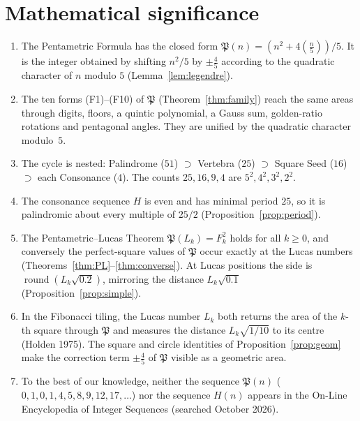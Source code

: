 \documentclass[11pt,a4paper]{article}
\newcommand{\Pent}{\mathfrak{P}}                      %
\newcommand{\leg}[1]{\left(\tfrac{#1}{5}\right)}      %
\theoremstyle{plain}
\theoremstyle{definition}
\theoremstyle{remark}
\begin{document}
\section{Mathematical significance}\label{sec:math}

\begin{enumerate}[itemsep=2pt]
  \item The Pentametric Formula has the closed form $\Pent(n)=(n^{2}+4\leg{n})/5$. It is the integer obtained by shifting $n^{2}/5$ by $\pm\tfrac45$ according to the quadratic character of $n$ modulo $5$ (Lemma~\ref{lem:legendre}).
  \item The ten forms (F1)–(F10) of $\Pent$ (Theorem~\ref{thm:family}) reach the same areas through digits, floors, a quintic polynomial, a Gauss sum, golden-ratio rotations and pentagonal angles. They are unified by the quadratic character modulo~$5$.
  \item The cycle is nested: Palindrome ($51$) $\supset$ Vertebra ($25$) $\supset$ Square Seed ($16$) $\supset$ each Consonance ($4$). The counts $25,16,9,4$ are $5^{2},4^{2},3^{2},2^{2}$.
  \item The consonance sequence $H$ is even and has minimal period $25$, so it is palindromic about every multiple of $25/2$ (Proposition~\ref{prop:period}).
  \item The Pentametric–Lucas Theorem $\Pent(L_k)=F_k^{2}$ holds for all $k\ge0$, and conversely the perfect-square values of $\Pent$ occur exactly at the Lucas numbers (Theorems~\ref{thm:PL}–\ref{thm:converse}). At Lucas positions the side is $\operatorname{round}(L_k\sqrt{0.2})$, mirroring the distance $L_k\sqrt{0.1}$ (Proposition~\ref{prop:simple}).
  \item In the Fibonacci tiling, the Lucas number $L_k$ both returns the area of the $k$-th square through $\Pent$ and measures the distance $L_k\sqrt{1/10}$ to its centre (Holden 1975). The square and circle identities of Proposition~\ref{prop:geom} make the correction term $\pm\tfrac45$ of $\Pent$ visible as a geometric area.
  \item To the best of our knowledge, neither the sequence $\Pent(n)$ ($0,1,0,1,4,5,8,9,12,17,\dots$) nor the sequence $H(n)$ appears in the On-Line Encyclopedia of Integer Sequences \cite{OEIS} (searched October 2026).
\end{enumerate}

\end{document}
